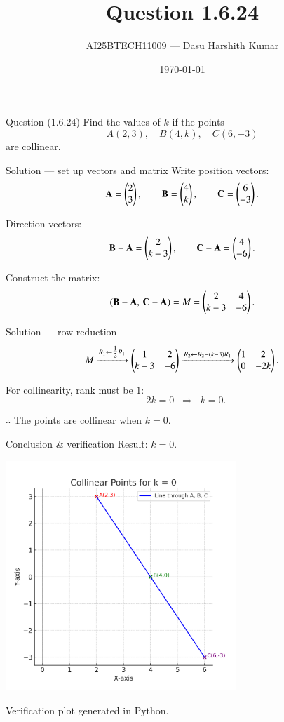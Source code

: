 \documentclass{beamer}
\title[Q 1.6.24 --- Collinearity]{ Question 1.6.24 }
\author[AI25BTECH11009]{AI25BTECH11009 --- Dasu Harshith Kumar}
\date{\today}
\begin{document}
\begin{frame}
  \titlepage
\end{frame}

\begin{frame}{Question (1.6.24)}
\small
Find the values of \(k\) if the points
\[
A(2,3),\quad B(4,k),\quad C(6,-3)
\]
are collinear.
\end{frame}

\begin{frame}{Solution --- set up vectors and matrix}
\small
Write position vectors:
\[
\mathbf{A}=\begin{pmatrix}2\\3\end{pmatrix},\qquad \mathbf{B}=\begin{pmatrix}4\\k\end{pmatrix},\qquad \mathbf{C}=\begin{pmatrix}6\\-3\end{pmatrix}.
\]

Direction vectors:
\[
\mathbf{B}-\mathbf{A}=\begin{pmatrix}2\\k-3\end{pmatrix},\qquad
\mathbf{C}-\mathbf{A}=\begin{pmatrix}4\\-6\end{pmatrix}.
\]

Construct the matrix:
\[
(\mathbf{B}-\mathbf{A},\,\mathbf{C}-\mathbf{A}) = M = \begin{pmatrix}2 & 4 \\ k-3 & -6\end{pmatrix}.
\]
\end{frame}

\begin{frame}{Solution --- row reduction}
\small
\[
M \xrightarrow{R_1\leftarrow \tfrac{1}{2}R_1}
\begin{pmatrix}1 & 2 \\ k-3 & -6\end{pmatrix}
\xrightarrow{R_2\leftarrow R_2 - (k-3)R_1}
\begin{pmatrix}1 & 2 \\ 0 & -2k\end{pmatrix}.
\]

For collinearity, rank must be \(1\):
\[
-2k=0 \;\;\Longrightarrow\;\; k=0.
\]

\(\therefore\) The points are collinear when \(k=0\).
\end{frame}

\begin{frame}{Conclusion \& verification}
\small
Result: \(k=0\).

\centering
\includegraphics[width=0.65\textwidth]{figs/image1.jpg}

\footnotesize
Verification plot generated in Python.
\end{frame}
\end{document}
